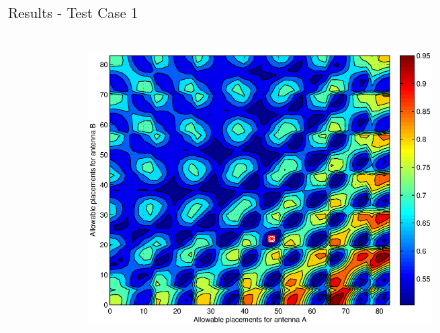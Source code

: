 \documentclass{beamer}
\begin{document}
\begin{frame}{Results - Test Case 1}
    \begin{columns}
        \begin{column}{.4\columnwidth}
            \begin{figure}
                \centering
                \begin{subfigure}{\columnwidth}
                    \includegraphics[width=\columnwidth,height=\columnwidth]{../paper/FIG/tc1_contour}%
                \end{subfigure}\hfill%
            \end{figure}


\end{column}
\end{columns}
\end{frame}
\end{document}
